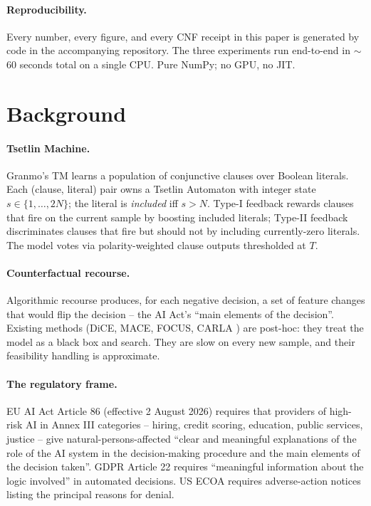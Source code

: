 \documentclass[11pt]{article}
\begin{document}
\paragraph{Reproducibility.}  Every number, every figure, and every CNF receipt in this paper is generated by code in the accompanying repository.  The three experiments run end-to-end in $\sim$$60$ seconds total on a single CPU.  Pure NumPy; no GPU, no JIT.

\section{Background}

\paragraph{Tsetlin Machine.}  Granmo's TM \citep{granmo2018tsetlin} learns a population of conjunctive clauses over Boolean literals.  Each (clause, literal) pair owns a Tsetlin Automaton with integer state $s \in \{1, \ldots, 2N\}$; the literal is \emph{included} iff $s > N$.  Type-I feedback rewards clauses that fire on the current sample by boosting included literals; Type-II feedback discriminates clauses that fire but should not by including currently-zero literals.  The model votes via polarity-weighted clause outputs thresholded at $T$.

\paragraph{Counterfactual recourse.}  Algorithmic recourse \citep{wachter2017counterfactual,ustun2019actionable,mothilal2020dice,karimi2020mace} produces, for each negative decision, a set of feature changes that would flip the decision -- the AI Act's ``main elements of the decision''.  Existing methods (DiCE, MACE, FOCUS, CARLA \citep{pawelczyk2021carla}) are post-hoc: they treat the model as a black box and search.  They are slow on every new sample, and their feasibility handling is approximate.

\paragraph{The regulatory frame.}  EU AI Act Article 86 (effective 2 August 2026) requires that providers of high-risk AI in Annex III categories -- hiring, credit scoring, education, public services, justice -- give natural-persons-affected ``clear and meaningful explanations of the role of the AI system in the decision-making procedure and the main elements of the decision taken''.  GDPR Article 22 requires ``meaningful information about the logic involved'' in automated decisions.  US ECOA \citep{usecoa} requires adverse-action notices listing the principal reasons for denial.
\end{document}
